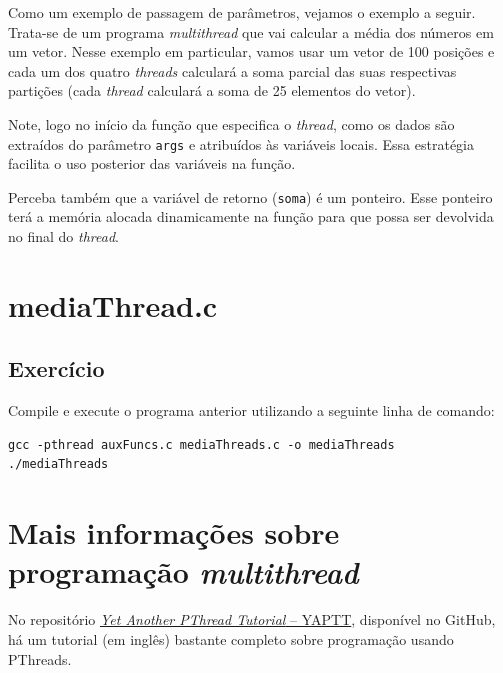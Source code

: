 Como um exemplo de passagem de parâmetros, vejamos o exemplo a seguir. Trata-se de um programa \textit{multithread} que vai calcular a média dos números em um vetor. Nesse exemplo em particular, vamos usar um vetor de 100 posições e cada um dos quatro \textit{threads} calculará a soma parcial das suas respectivas partições (cada \textit{thread} calculará a soma de 25 elementos do vetor).

Note, logo no início da função que especifica o \textit{thread}, como os dados são extraídos do parâmetro \texttt{args} e atribuídos às variáveis locais. Essa estratégia facilita o uso posterior das variáveis na função.

Perceba também que a variável de retorno (\texttt{soma}) é um ponteiro. Esse ponteiro terá a memória alocada dinamicamente na função para que possa ser devolvida no final do \textit{thread}. 

\section*{mediaThread.c}


\subsection{Exercício}
Compile e execute o programa anterior utilizando a seguinte linha de comando:

\begin{lstlisting}[style=MyBashStyle]
gcc -pthread auxFuncs.c mediaThreads.c -o mediaThreads
./mediaThreads
\end{lstlisting}




\section{Mais informações sobre programação \textit{multithread}}

No repositório \href{https://github.com/gradvohl/YAPTT}{\textit{Yet Another PThread Tutorial} -- YAPTT}, disponível no GitHub, há um tutorial (em inglês) bastante completo sobre programação usando PThreads.